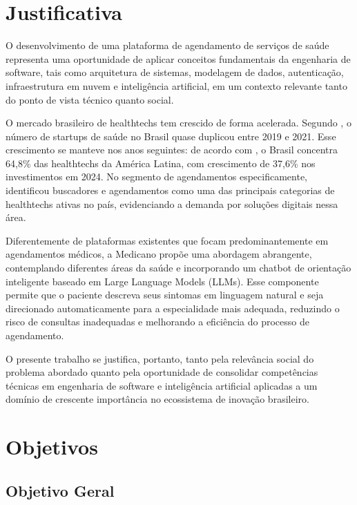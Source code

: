 \section{Justificativa}
\label{sec:justification}

O desenvolvimento de uma plataforma de agendamento de serviços
de saúde representa uma oportunidade de aplicar conceitos
fundamentais da engenharia de software, tais como arquitetura
de sistemas, modelagem de dados, autenticação, infraestrutura
em nuvem e inteligência artificial, em um contexto relevante
tanto do ponto de vista técnico quanto social.

O mercado brasileiro de healthtechs tem crescido de forma
acelerada. Segundo , o número
de startups de saúde no Brasil quase duplicou entre 2019 e 2021.
Esse crescimento se manteve nos anos seguintes: de acordo com
, o Brasil concentra 64,8\% das
healthtechs da América Latina, com crescimento de 37,6\% nos
investimentos em 2024. No segmento de agendamentos
especificamente,  identificou
buscadores e agendamentos como uma das principais categorias
de healthtechs ativas no país, evidenciando a demanda por
soluções digitais nessa área.

Diferentemente de plataformas existentes que focam
predominantemente em agendamentos médicos, a Medicano propõe
uma abordagem abrangente, contemplando diferentes áreas da
saúde e incorporando um chatbot de orientação inteligente baseado
em Large Language Models (LLMs). Esse componente permite que
o paciente descreva seus sintomas em linguagem natural e seja
direcionado automaticamente para a especialidade mais adequada,
reduzindo o risco de consultas inadequadas e melhorando a
eficiência do processo de agendamento.

O presente trabalho se justifica, portanto, tanto pela
relevância social do problema abordado quanto pela oportunidade
de consolidar competências técnicas em engenharia de software
e inteligência artificial aplicadas a um domínio de crescente
importância no ecossistema de inovação brasileiro.

\section{Objetivos}
\label{sec:objectives}

\subsection{Objetivo Geral}
\label{subsec:general-objective}

